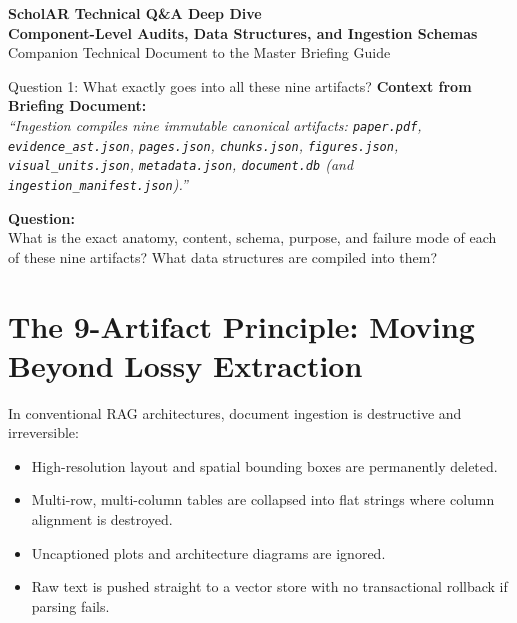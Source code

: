 \documentclass[11pt,a4paper]{article}
\begin{document}
\begin{center}
    {\LARGE\textbf{\color{scholardark}ScholAR Technical Q\&A Deep Dive}}\\[4pt]
    {\large\textbf{\color{scholarblue}Component-Level Audits, Data Structures, and Ingestion Schemas}}\\[2pt]
    \textcolor{scholargray}{\small Companion Technical Document to the Master Briefing Guide}
\end{center}

\vspace{-0.2em}

\begin{questionbox}{Question 1: What exactly goes into all these nine artifacts?}
\textbf{Context from Briefing Document:}\\
\textit{``Ingestion compiles nine immutable canonical artifacts: \texttt{paper.pdf}, \texttt{evidence\_ast.json}, \texttt{pages.json}, \texttt{chunks.json}, \texttt{figures.json}, \texttt{visual\_units.json}, \texttt{metadata.json}, \texttt{document.db} (and \texttt{ingestion\_manifest.json}).''}

\vspace{3pt}
\textbf{Question:}\\
What is the exact anatomy, content, schema, purpose, and failure mode of each of these nine artifacts? What data structures are compiled into them?
\end{questionbox}

\vspace{-0.2em}

\section{The 9-Artifact Principle: Moving Beyond Lossy Extraction}

In conventional RAG architectures, document ingestion is destructive and irreversible:
\begin{itemize}[noitemsep,topsep=1pt]
    \item High-resolution layout and spatial bounding boxes are permanently deleted.
    \item Multi-row, multi-column tables are collapsed into flat strings where column alignment is destroyed.
    \item Uncaptioned plots and architecture diagrams are ignored.
    \item Raw text is pushed straight to a vector store with no transactional rollback if parsing fails.
\end{itemize}
\end{document}
